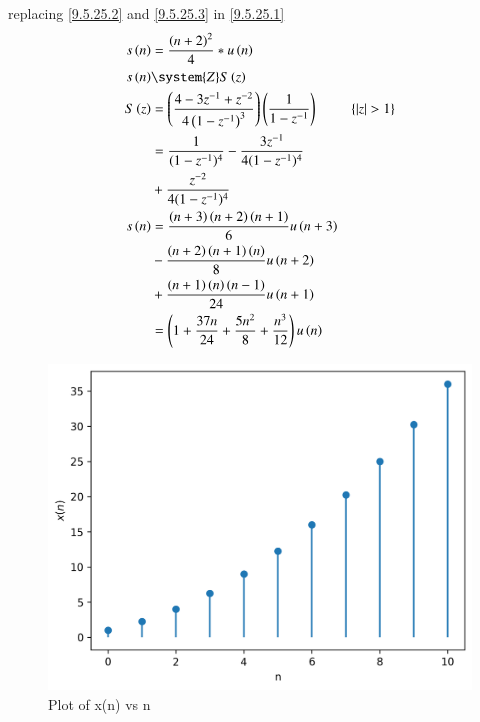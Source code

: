 \documentclass[journal,12pt,twocolumn]{article}
\begin{document}
replacing \eqref{9.5.25.2} and \eqref{9.5.25.3} in \eqref{9.5.25.1}
\begin{align}
    s\brak{n}& = \frac{\brak{n+2}^2}{4} * u\brak{n} \\
    s\brak{n} & \system{Z} S\brak{z} \\
    S\brak{z} & = \brak{\frac{4 -3z^{-1} + z^{-2}}{4\brak{1-z^{-1}}^3}} \brak{\frac{1}{1-z^{-1}}} & \cbrak{|z|>1}\\
    & = \frac{1}{(1 - z^{-1})^4} - \frac{3z^{-1}}{4(1 - z^{-1})^4}\notag\\
    & + \frac{z^{-2}}{4(1 - z^{-1})^4}\\
    s\brak{n} & = \frac{\brak{n + 3} \brak{n + 2}\brak{n+1}}{6}u\brak{n+3}\notag\\
    & - \frac{\brak{n + 2} \brak{n + 1}\brak{n}}{8}u\brak{n+2}\notag\\
    & + \frac{\brak{n + 1} \brak{n}\brak{n-1}}{24}u\brak{n+1}\\
    & = \brak{1 + \frac{37n}{24} + \frac{5n^2}{8} + \frac{n^3}{12}} u\brak{n} 
\end{align}

\begin{figure}[h]
   \centering
   \includegraphics[width=1\columnwidth]{figs/plot.png}
   \caption{Plot of x(n) vs n}
   \label {fig: 11.9.5.25.1}
\end{figure}
\end{document}
